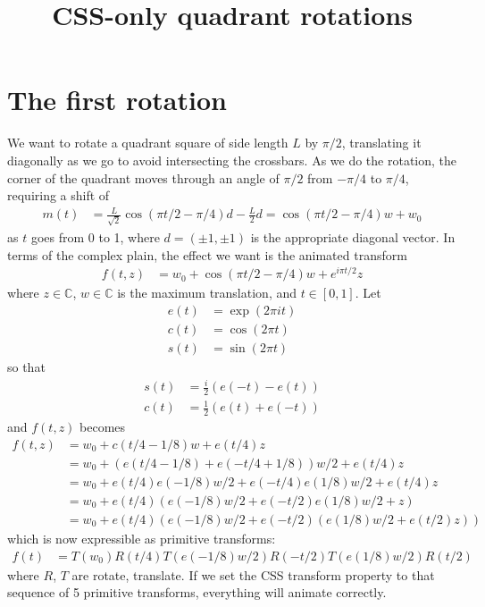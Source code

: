 \documentclass[11pt, oneside]{article}
\title{CSS-only quadrant rotations}
\author{}
\date{}
\newcommand{\C}{\mathbb{C}}
\begin{document}
\maketitle

\section{The first rotation}

We want to rotate a quadrant square of side length $L$ by $\pi/2$, translating it diagonally
as we go to avoid intersecting the crossbars.
As we do the rotation, the corner of the quadrant moves through an angle of $\pi/2$ from $-\pi/4$ to $\pi/4$,
requiring a shift of
\begin{align*}
m(t) &= \frac{L}{\sqrt{2}} \cos(\pi t/2 - \pi/4) d - \frac{L}{2} d = \cos(\pi t/2 - \pi/4) w + w_0
\end{align*}
as $t$ goes from 0 to 1, where $d = (\pm 1, \pm 1)$ is the appropriate diagonal vector.
In terms of the complex plain, the effect we want is the animated transform
\begin{align*}
f(t,z) &= w_0 + \cos(\pi t/2 - \pi/4) w + e^{i \pi t/2} z
\end{align*}
where $z \in \C$, $w \in \C$ is the maximum translation, and $t \in [0,1]$.  Let
\begin{align*}
e(t) &= \exp(2 \pi i t) \\
c(t) &= \cos(2 \pi t) \\
s(t) &= \sin(2 \pi t)
\end{align*}
so that
\begin{align*}
s(t) &= \frac{i}{2} (e(-t) - e(t)) \\
c(t) &= \frac{1}{2} (e(t) + e(-t))
\end{align*}
and $f(t,z)$ becomes
\begin{align*}
f(t,z) &= w_0 + c(t/4 - 1/8) w + e(t/4) z \\
  &= w_0 + (e(t/4 - 1/8) + e(-t/4 + 1/8)) w/2 + e(t/4) z \\
  &= w_0 + e(t/4)e(-1/8) w/2 + e(-t/4)e(1/8) w/2 + e(t/4) z \\
  &= w_0 + e(t/4)(e(-1/8) w/2 + e(-t/2)e(1/8) w/2 + z) \\
  &= w_0 + e(t/4)(e(-1/8) w/2 + e(-t/2) (e(1/8) w/2 + e(t/2) z))
\end{align*}
which is now expressible as primitive transforms:
\begin{align*}
f(t) &= T(w_0) R(t/4) T(e(-1/8) w/2) R(-t/2) T(e(1/8) w/2) R(t/2)
\end{align*}
where $R$, $T$ are rotate, translate.  If we set the CSS transform property to that sequence of 5 primitive
transforms, everything will animate correctly.
\end{document}
